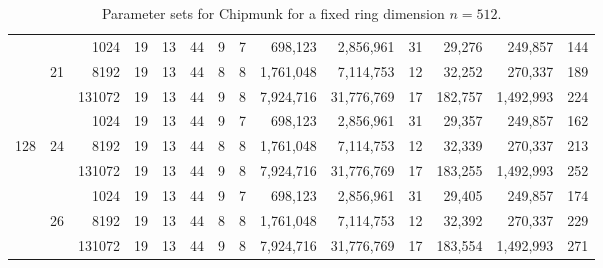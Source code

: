 \begin{table*}
\begin{tabular}{ccr|cc|cccrr|crr|c}
      &       &   1024 &         19 &        13 &        44 &          9 &       7 &        698,123 &  2,856,961 &    31 &       29,276 &   249,857 & 144 \\%
      &    21 &   8192 &         19 &        13 &       44 &          8 &       8 &      1,761,048 &  7,114,753 &    12 &       32,252 &   270,337 & 189 \\%
      &       & 131072 &         19 &        13 &       44 &          9 &       8 &      7,924,716 & 31,776,769 &    17 &      182,757 & 1,492,993 & 224 \\\cline{2-14}
  
      &       &   1024 &         19 &        13 &       44 &          9 &       7 &        698,123 &  2,856,961 &    31 &       29,357 &   249,857 & 162 \\%
  128 &    24 &   8192 &         19 &        13 &       44 &          8 &       8 &      1,761,048 &  7,114,753 &    12 &       32,339 &   270,337 & 213 \\%
      &       & 131072 &         19 &        13 &       44 &          9 &       8 &      7,924,716 & 31,776,769 &    17 &      183,255 & 1,492,993 & 252 \\\cline{2-14}
  
      &       &   1024 &         19 &        13 &       44 &          9 &       7 &        698,123 &  2,856,961 &    31 &       29,405 &   249,857 & 174 \\%
      &    26 &   8192 &         19 &        13 &       44 &          8 &       8 &      1,761,048 &  7,114,753 &    12 &       32,392 &   270,337 & 229 \\%
      &       & 131072 &         19 &        13 &       44 &          9 &       8 &      7,924,716 & 31,776,769 &    17 &      183,554 & 1,492,993 & 271 \\\bottomrule
    \end{tabular}
    \caption{Parameter sets for Chipmunk for a fixed ring dimension $n=512$.}\label{tab:param}
  \end{table*}
\egroup

